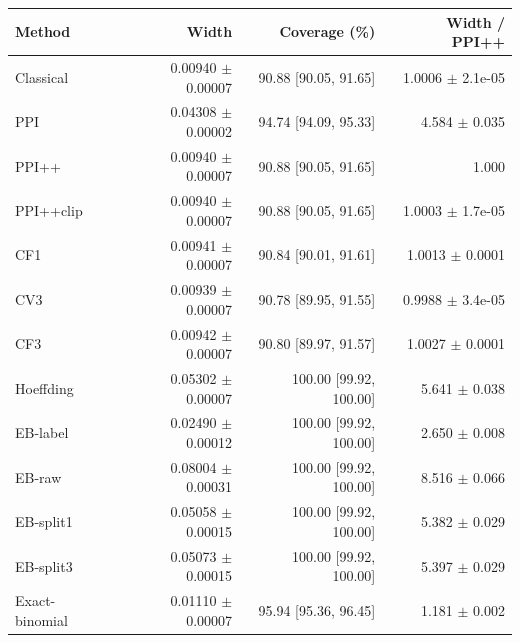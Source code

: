 \small
\begin{tabular}{lrrr}
\toprule
Method & Width & Coverage (\%) & Width / PPI++ \\
\midrule
Classical & 0.00940 $\pm$ 0.00007 & 90.88 [90.05, 91.65] & 1.0006 $\pm$ 2.1e-05 \\
PPI & 0.04308 $\pm$ 0.00002 & 94.74 [94.09, 95.33] & 4.584 $\pm$ 0.035 \\
PPI++ & 0.00940 $\pm$ 0.00007 & 90.88 [90.05, 91.65] & 1.000 \\
PPI++clip & 0.00940 $\pm$ 0.00007 & 90.88 [90.05, 91.65] & 1.0003 $\pm$ 1.7e-05 \\
CF1 & 0.00941 $\pm$ 0.00007 & 90.84 [90.01, 91.61] & 1.0013 $\pm$ 0.0001 \\
CV3 & 0.00939 $\pm$ 0.00007 & 90.78 [89.95, 91.55] & 0.9988 $\pm$ 3.4e-05 \\
CF3 & 0.00942 $\pm$ 0.00007 & 90.80 [89.97, 91.57] & 1.0027 $\pm$ 0.0001 \\
Hoeffding & 0.05302 $\pm$ 0.00007 & 100.00 [99.92, 100.00] & 5.641 $\pm$ 0.038 \\
EB-label & 0.02490 $\pm$ 0.00012 & 100.00 [99.92, 100.00] & 2.650 $\pm$ 0.008 \\
EB-raw & 0.08004 $\pm$ 0.00031 & 100.00 [99.92, 100.00] & 8.516 $\pm$ 0.066 \\
EB-split1 & 0.05058 $\pm$ 0.00015 & 100.00 [99.92, 100.00] & 5.382 $\pm$ 0.029 \\
EB-split3 & 0.05073 $\pm$ 0.00015 & 100.00 [99.92, 100.00] & 5.397 $\pm$ 0.029 \\
Exact-binomial & 0.01110 $\pm$ 0.00007 & 95.94 [95.36, 96.45] & 1.181 $\pm$ 0.002 \\
\bottomrule
\end{tabular}
